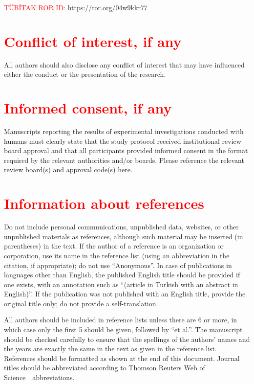 \documentclass{elektr}
\begin{document}
\noindent \textcolor{red}{TÜBİTAK ROR ID:   \href{https://ror.org/04w9kkr77}{https://ror.org/04w9kkr77}}

\section*{\textcolor{red}{Conflict of interest, if any}}

All authors should also disclose any conflict of interest that may have influenced either the conduct or the presentation of the research.

\section*{\textcolor{red}{Informed consent, if any}}
Manuscripts reporting the results of experimental investigations conducted with humans must clearly state that the study protocol received institutional review board approval and that all participants provided informed consent in the format required by the relevant authorities and/or boards. Please reference the relevant review board(s) and approval code(s) here.\\

\section{\textcolor{red}{Information about references}}
Do not include personal communications, unpublished data, websites, or other unpublished materials as references, although such material may be inserted (in parentheses) in the text. If the author of a reference is an organization or corporation, use its name in the reference list (using an abbreviation in the citation, if appropriate); do not use ``Anonymous''. In case of publications in languages other than English, the published English title should be provided if one exists, with an annotation such as ``(article in Turkish with an abstract in English)''. If the publication was not published with an English title, provide the original title only; do not provide a self-translation.

All authors should be included in reference lists unless there are 6 or more, in which case only the first 5 should be given, followed by ``et al.''. The manuscript should be checked carefully to ensure that the spellings of the authors' names and the years are exactly the same in the text as given in the reference list. References should be formatted as shown at the end of this document. Journal titles should be abbreviated according to Thomson Reuters Web of Science~\textcopyright~abbreviations.
\end{document}
